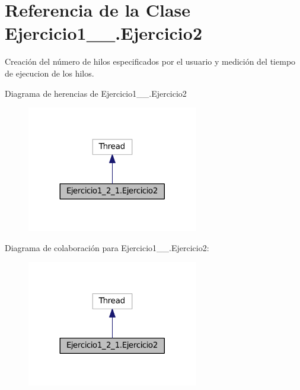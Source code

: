 \hypertarget{class_ejercicio1__2__1_1_1_ejercicio2}{}\section{Referencia de la Clase Ejercicio1\+\_\+\_.\+Ejercicio2}
\label{class_ejercicio1__2__1_1_1_ejercicio2}


Creación del número de hilos especificados por el usuario y medición del tiempo de ejecucion de los hilos.  




Diagrama de herencias de Ejercicio1\+\_\+\_.\+Ejercicio2
\nopagebreak
\begin{figure}[H]
\begin{center}
\leavevmode
\includegraphics[width=212pt]{class_ejercicio1__2__1_1_1_ejercicio2__inherit__graph}
\end{center}
\end{figure}


Diagrama de colaboración para Ejercicio1\+\_\+\_.\+Ejercicio2\+:
\nopagebreak
\begin{figure}[H]
\begin{center}
\leavevmode
\includegraphics[width=212pt]{class_ejercicio1__2__1_1_1_ejercicio2__coll__graph}
\end{center}
\end{figure}
